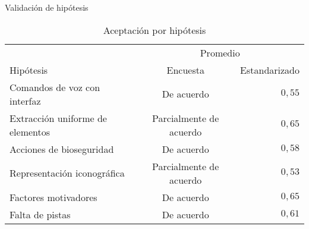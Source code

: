\begin{frame}{Validación de hipótesis}


\begin{table}
\scriptsize
\centering
\begin{tabular}{lcr}
\toprule
& \multicolumn{2}{c}{Promedio} \\
\cmidrule(lr){2-3}
Hipótesis                        & Encuesta                & Estandarizado \\
\midrule
Comandos de voz con interfaz     & De acuerdo              & $0,55$ \\
Extracción uniforme de elementos & Parcialmente de acuerdo & $0,65$ \\
Acciones de bioseguridad         & De acuerdo              & $0,58$ \\
Representación iconográfica      & Parcialmente de acuerdo & $0,53$ \\
Factores motivadores             & De acuerdo              & $0,65$ \\
Falta de pistas                  & De acuerdo              & $0,61$ \\
\bottomrule
\end{tabular}
\caption{Aceptación por hipótesis}
\end{table}

\end{frame}

